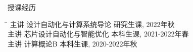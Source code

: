 \begin{rSection}{授课经历}

\begin{tabbing}
\hspace{0.8in}\= \hspace{4.2in}\= \kill
主讲 \> 设计自动化与计算系统导论 \> { 研究生课, 2022年秋} \\
主讲 \> 芯片设计自动化与智能优化 \> { 本科生课, 2021-2022年春 } \\
主讲 \> 计算概论B \> { 本科生课, 2020-2022年秋 } \\
\end{tabbing}

\end{rSection}
